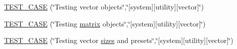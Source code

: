 \begin{DoxyCompactItemize}
\item 
\hyperlink{namespacemc_a319c6126a78b28d29fe78989eb91141b}{T\+E\+S\+T\+\_\+\+C\+A\+SE} (\char`\"{}Testing vector objects\char`\"{},\char`\"{}\mbox{[}system\mbox{]}\mbox{[}utility\mbox{]}\mbox{[}vector\mbox{]}\char`\"{})
\item 
\hyperlink{namespacemc_ae77de2b0853c07c5eaae1c277fbcf2ff}{T\+E\+S\+T\+\_\+\+C\+A\+SE} (\char`\"{}Testing \hyperlink{_s_d_l__opengl__glext_8h_a7b24a3f2f56eb1244ae69dacb4fecb6f}{matrix} objects\char`\"{},\char`\"{}\mbox{[}system\mbox{]}\mbox{[}utility\mbox{]}\mbox{[}vector\mbox{]}\char`\"{})
\item 
\hyperlink{namespacemc_ab91b863ba970097afeb616d19c7d0927}{T\+E\+S\+T\+\_\+\+C\+A\+SE} (\char`\"{}Testing vector \hyperlink{_s_d_l__opengl__glext_8h_a9ded28672f8b805d6b467777d0ac7b6f}{sizes} and presets\char`\"{},\char`\"{}\mbox{[}system\mbox{]}\mbox{[}utility\mbox{]}\mbox{[}vector\mbox{]}\char`\"{})
\end{DoxyCompactItemize}
